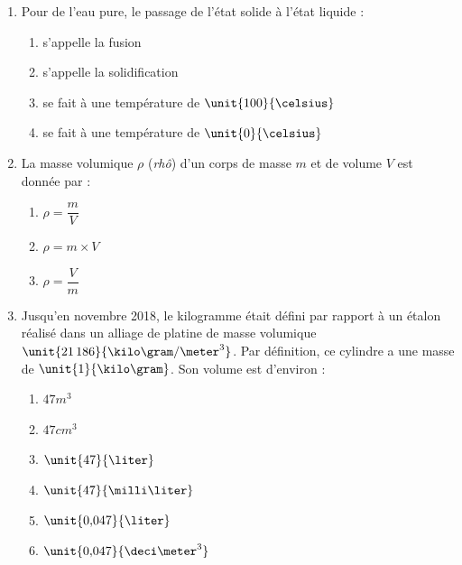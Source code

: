 \begin{enumerate}
\item Pour de l'eau pure, le passage de l'état solide à l'état liquide :
\begin{multicols}{2}
\begin{enumerate}
\item s'appelle la fusion
\item s'appelle la solidification
\item se fait à une température de $\unit{100}{\celsius}$
\item se fait à une température de $\unit{0}{\celsius}$
\end{enumerate}
\end{multicols}


\item La masse volumique $\rho$ (\emph{rhô}) d'un corps de masse $m$ et de volume $V$ est donnée par :
\begin{multicols}{3}
\begin{enumerate}
\item $\rho= \dfrac{m}{V}$
\item $\rho= m \times V$
\item $\rho= \dfrac{V}{m}$
\end{enumerate}
\end{multicols}

\item Jusqu'en novembre 2018, le kilogramme était défini par rapport à un étalon réalisé dans un alliage de platine de masse volumique $\unit{21\,186}{\kilo\gram/\meter^3}$.
Par définition, ce cylindre a une masse de $\unit{1}{\kilo\gram}$.
Son volume est d'environ :
\begin{multicols}{3}
\begin{enumerate}
\item $\unit{47}{m^3}$
\item $\unit{47}{cm^3}$
\item $\unit{47}{\liter}$
\item $\unit{47}{\milli\liter}$
\item $\unit{0{,}047}{\liter}$
\item $\unit{0{,}047}{\deci\meter^3}$
\end{enumerate}
\end{multicols}


\end{enumerate}

